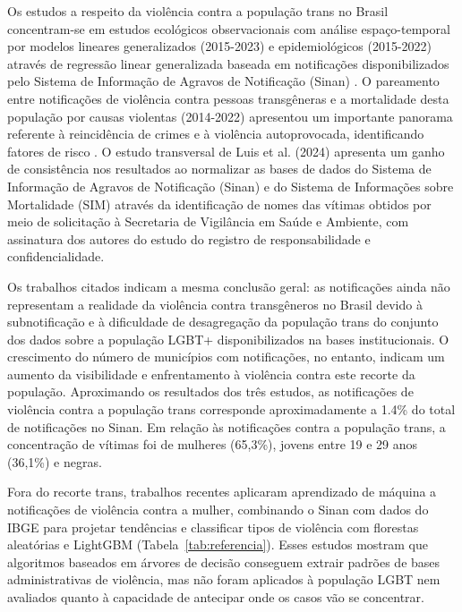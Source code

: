 \documentclass[12pt]{article}
\begin{document}
Os estudos a respeito da violência contra a população trans no Brasil concentram-se em estudos ecológicos observacionais com análise espaço-temporal por modelos lineares generalizados (2015-2023) \cite{leal_silva_lizzi:2026} e epidemiológicos (2015-2022) através de regressão linear generalizada baseada em notificações disponibilizados pelo Sistema de Informação de Agravos de Notificação (Sinan) \cite{marinho_tomazelli_firianelli:2024}. O pareamento entre notificações de violência contra pessoas transgêneras e a mortalidade desta população por causas violentas (2014-2022) apresentou um importante panorama referente à reincidência de crimes e à violência autoprovocada, identificando fatores de risco \cite{luis:2025}. O estudo transversal de Luis et al. (2024) apresenta um ganho de consistência nos resultados ao normalizar as bases de dados do Sistema de Informação de Agravos de Notificação (Sinan) e do Sistema de Informações sobre Mortalidade (SIM) através da identificação de nomes das vítimas obtidos por meio de solicitação à Secretaria de Vigilância em Saúde e Ambiente, com assinatura dos autores do estudo do registro de responsabilidade e confidencialidade. 

Os trabalhos citados indicam a mesma conclusão geral: as notificações ainda não representam a realidade da violência contra transgêneros no Brasil devido à subnotificação e à dificuldade de desagregação da população trans do conjunto dos dados sobre a população LGBT+ disponibilizados na bases institucionais. O crescimento do número de municípios com notificações, no entanto, indicam um aumento da visibilidade e enfrentamento à violência contra este recorte da população. Aproximando os resultados dos três estudos, as notificações de violência contra a população trans corresponde aproximadamente a 1.4\% do total de notificações no Sinan. Em relação às notificações contra a população trans, a concentração de vítimas foi de mulheres (65,3\%), jovens entre 19 e 29 anos (36,1\%) e negras. %

Fora do recorte trans, trabalhos recentes aplicaram aprendizado de máquina a notificações de violência contra a mulher, combinando o Sinan com dados do IBGE para projetar tendências e classificar tipos de violência com florestas aleatórias e LightGBM (Tabela~\ref{tab:referencia}). Esses estudos mostram que algoritmos baseados em árvores de decisão conseguem extrair padrões de bases administrativas de violência, mas não foram aplicados à população LGBT nem avaliados quanto à capacidade de antecipar onde os casos vão se concentrar.
\end{document}

